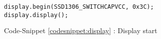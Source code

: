 \documentclass{article}
\begin{document}
\begin{lstlisting}
display.begin(SSD1306_SWITCHCAPVCC, 0x3C);
display.display();
\end{lstlisting}

\begin{center}
    Code-Snippet \ref{codesnippet:display} : Display start
\end{center}

\label{codesnippet:display}

\newpage %

\printindex %
\end{document}
